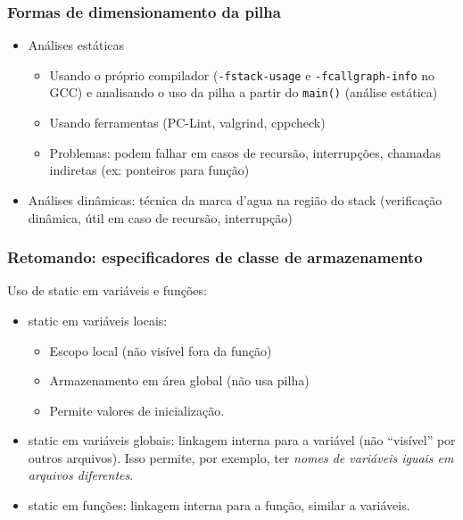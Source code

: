 \documentclass{beamer}
\begin{document}
\begin{frame}
	\frametitle{Formas de dimensionamento da pilha}
	\begin{itemize}
		\item Análises estáticas
		\begin{itemize}
			\item Usando o próprio compilador (\texttt{-fstack-usage} e \texttt{-fcallgraph-info} no GCC) e analisando o uso da pilha a partir do \texttt{main()} (análise estática)
			\item Usando ferramentas (PC-Lint, valgrind, cppcheck)
			\item Problemas: podem falhar em casos de recursão, interrupções, chamadas indiretas (ex: ponteiros para função)
		\end{itemize}
		\item Análises dinâmicas: técnica da marca d'agua na região do stack (verificação dinâmica, útil em caso de recursão, interrupção)
		\end{itemize}
\end{frame}

\begin{frame}
	\frametitle{Retomando: especificadores de classe de armazenamento}
		Uso de static em variáveis e funções:
	\vspace*{0.5cm}
	\begin{itemize}
	\item static em variáveis locais:
		\begin{itemize}
		\item Escopo local (não visível fora da função)
		\item Armazenamento em área global (não usa pilha)
		\item Permite valores de inicialização.
		\end{itemize}
	\item static em variáveis globais: linkagem interna para a variável (não ``visível'' por outros arquivos).  Isso permite, por exemplo, ter \textit{nomes de variáveis iguais em arquivos diferentes}.
	\item static em funções: linkagem interna para a função, similar a variáveis.
	\end{itemize}
\end{frame}
\end{document}
